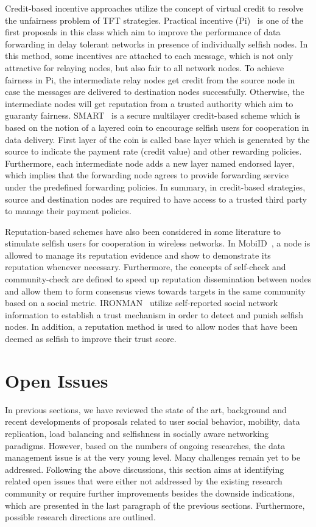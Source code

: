 Credit-based incentive approaches utilize the concept of virtual credit to resolve the unfairness problem of TFT strategies. Practical incentive (Pi)~\cite{RLu2010} is one of the first proposals in this class which aim to improve the performance of data forwarding in delay tolerant networks in presence of individually selfish nodes. In this method, some incentives are attached to each message, which is not only attractive for relaying nodes, but also fair to all network nodes. To achieve fairness in Pi, the intermediate relay nodes get credit from the source node in case the messages are delivered to destination nodes successfully. Otherwise, the intermediate nodes will get reputation from a trusted authority which aim to guaranty fairness. SMART~\cite{HZhu2009} is a secure multilayer credit-based scheme which is based on the notion of a layered coin to encourage selfish users for cooperation in data delivery. First layer of the coin is called base layer which is generated by the source to indicate the payment rate (credit value) and other rewarding policies. Furthermore, each intermediate node adds a new layer named endorsed layer, which implies that the forwarding node agrees to provide forwarding service under the predefined forwarding policies. In summary, in credit-based strategies, source and destination nodes are required to have access to a trusted third party to manage their payment policies.

Reputation-based schemes have also been considered in some literature to stimulate selfish users for cooperation in wireless networks. In MobiID~\cite{LWei2011}, a node is allowed to manage its reputation evidence and show to demonstrate its reputation whenever necessary. Furthermore, the concepts of self-check and community-check are defined to speed up reputation dissemination between nodes and allow them to form consensus views towards targets in the same community based on a social metric. IRONMAN~\cite{GBigwood2011} utilize self-reported social network information to establish a trust mechanism in order to detect and punish selfish nodes. In addition, a reputation method is used to allow nodes that have been deemed as selfish to improve their trust score.

\section{Open Issues}\label{Chap2_07}
In previous sections, we have reviewed the state of the art, background and recent developments of proposals related to user social behavior, mobility, data replication, load balancing and selfishness in socially aware networking paradigms. However, based on the numbers of ongoing researches, the data management issue is at the very young level. Many challenges remain yet to be addressed. Following the above discussions, this section aims at identifying related open issues that were either not addressed by the existing research community or require further improvements besides the downside indications, which are presented in the last paragraph of the previous sections. Furthermore, possible research directions are outlined.

